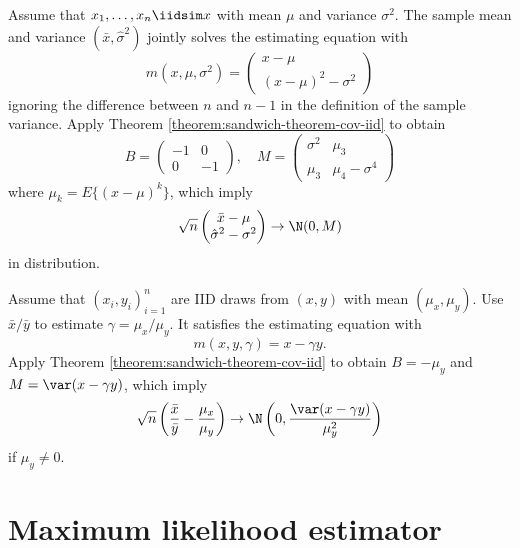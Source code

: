 \begin{example}
\label{eg::sample-meanandvariance}
Assume that $x_1,\ldots, x_n \iidsim x$ with mean $\mu$ and variance $\sigma^2$. The sample mean and variance $(\bar{x}, \hat{\sigma}^2)$ jointly solves the estimating equation with
$$
m(x, \mu, \sigma^2) = \begin{pmatrix}
x - \mu \\
(x-\mu)^2 - \sigma^2
\end{pmatrix}
$$
ignoring the difference between $n$ and $n-1$ in the definition of the sample variance. Apply Theorem \ref{theorem:sandwich-theorem-cov-iid} to obtain 
$$
B = \begin{pmatrix}
-1 & 0 \\ 
0 & -1
\end{pmatrix},\quad
M = \begin{pmatrix}
\sigma^2 & \mu_3 \\
\mu_3 & \mu_4 - \sigma^4
\end{pmatrix}
$$
where $\mu_k = E\{ (x-\mu)^k\}$, which imply 
$$
\sqrt{n} \begin{pmatrix}
\bar{x} - \mu \\
\hat{\sigma}^2 - \sigma^2
\end{pmatrix} \rightarrow 
\N(0, M)
$$
in distribution. 
\end{example}




\begin{example}
Assume that $(x_i, y_i)_{i=1}^n$ are IID draws from $(x,y)$ with mean $(\mu_x, \mu_y)$. Use $\bar{x} / \bar{y}$ to estimate $\gamma = \mu_x / \mu_y$. It satisfies the estimating equation with 
$$
m(x,y,\gamma) = x - \gamma y .
$$
Apply Theorem \ref{theorem:sandwich-theorem-cov-iid} to obtain $B = -\mu_y$ and $M = \var(x-\gamma y)$, which imply 
$$
\sqrt{n} \left(   \frac{ \bar{x} }{ \bar{y} }  - \frac{ \mu_x }{   \mu_y }  \right)
\rightarrow
\N\left(0,   \frac{  \var(x-\gamma y) }{  \mu_y^2  }   \right)
$$
if $\mu_y \neq 0$. 
\end{example}


 
\section{Maximum likelihood estimator}\label{sec::mle}

